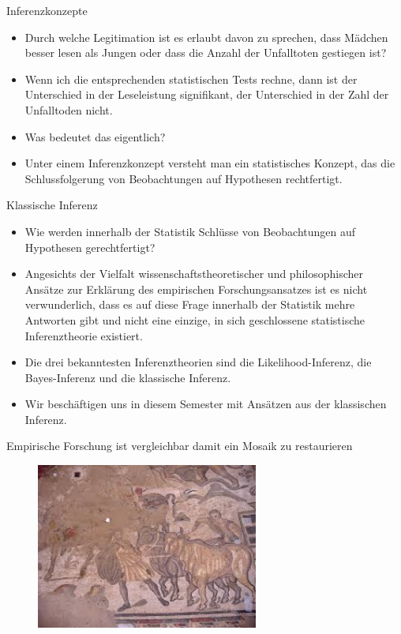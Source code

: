 \documentclass[usenames,dvipsnames,handout]{beamer}
\begin{document}
\begin{frame}{Inferenzkonzepte}
\begin{itemize}
\item{Durch welche Legitimation ist es erlaubt davon zu sprechen, dass Mädchen besser lesen als Jungen oder dass die Anzahl der Unfalltoten gestiegen ist?}
\item{Wenn ich die entsprechenden statistischen Tests rechne, dann ist der Unterschied in der Leseleistung signifikant, der Unterschied in der Zahl der Unfalltoden nicht.}
\item{Was bedeutet das eigentlich?}
\item{Unter einem Inferenzkonzept versteht man ein statistisches Konzept, das die Schlussfolgerung von Beobachtungen auf Hypothesen rechtfertigt.}
\end{itemize}
\end{frame}



\begin{frame}{Klassische Inferenz}
\begin{itemize}
\item{Wie werden innerhalb der Statistik Schlüsse von Beobachtungen auf Hypothesen gerechtfertigt?}\pause
\item{Angesichts der Vielfalt wissenschaftstheoretischer und philosophischer Ansätze zur Erklärung des empirischen Forschungsansatzes
ist es nicht verwunderlich, dass es auf diese Frage innerhalb der Statistik mehre Antworten gibt und nicht eine einzige, in sich geschlossene statistische Inferenztheorie
existiert. }\pause%
\item{Die drei bekanntesten Inferenztheorien sind die Likelihood-Inferenz, die Bayes-Inferenz und die klassische Inferenz.}
\item{Wir beschäftigen uns in diesem Semester mit Ansätzen aus der klassischen Inferenz.}
\end{itemize}
\end{frame}


\begin{frame}{Empirische Forschung ist vergleichbar damit ein Mosaik zu restaurieren}
     \begin{figure}[ht]
 	\centering
 	      \includegraphics[width=0.65\textwidth]{incomplete.jpg}
 	\end{figure}
\end{frame}
\end{document}
